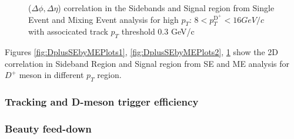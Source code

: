 \begin{figure}[!ht]
\centering
 \caption{($\Delta \phi , \Delta \eta$) correlation in the Sidebands and Signal region from Single Event and Mixing Event analysis for high $p_{T}$: $8< p_{T}^{\text{D}^+}< 16 GeV/c$ with associcated track $p_{T}$ threshold 0.3 GeV/c }
\label{fig:DplusSEbyMEPlots3}
\end{figure}

Figures \ref{fig:DplusSEbyMEPlots1}, \ref{fig:DplusSEbyMEPlots2}, \ref{fig:DplusSEbyMEPlots3} show the 2D correlation in Sideband Region and Signal region from SE and ME analysis for $D^+$ meson in different $p_{T}$ region.



\newpage
\subsubsection{Tracking and D-meson trigger efficiency}



\subsubsection{Beauty feed-down}

